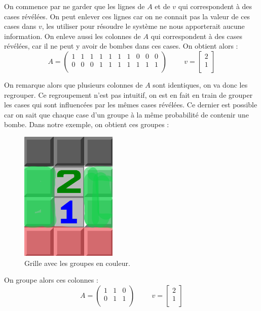 On commence par ne garder que les lignes de $A$ et de $v$ qui correspondent à des cases révélées.
On peut enlever ces lignes car on ne connait pas la valeur de ces cases dans $v$, les utiliser pour résoudre le système ne nous apporterait aucune information.
\newline
\newline
On enleve aussi les colonnes de $A$ qui correspondent à des cases révélées, car il ne peut y avoir de bombes dans ces cases.
\newline
On obtient alors :
\[
    A = \begin{pmatrix}
        1 & 1 & 1 & 1 & 1 & 1 & 1 & 0 & 0 & 0 \\
        0 & 0 & 0 & 1 & 1 & 1 & 1 & 1 & 1 & 1 \\
    \end{pmatrix}
    \hspace{1cm}
    v = \begin{bmatrix} 2 \\1 \\ \end{bmatrix}
\]

On remarque alors que plusieurs colonnes de $A$ sont identiques, on va donc les regrouper.
Ce regroupement n'est pas intuitif, on est en fait en train de grouper les cases qui sont influencées par les mêmes cases révélées.
Ce dernier est possible car on sait que chaque case d'un groupe à la même probabilité de contenir une bombe.
\newline
Dans notre exemple, on obtient ces groupes :

\begin{figure}[!htpb]
    \centering
    \includegraphics[width=0.2\linewidth]{Figures/groups-on-board.png}
    \caption[Grille avec les groupes en couleur]{Grille avec les groupes en couleur.}
    \label{fig:groups-on-board}
\end{figure}

On groupe alors ces colonnes :
\[
    A = \begin{pmatrix}
        1 & 1 & 0 \\
        0 & 1 & 1 \\
    \end{pmatrix}
    \hspace{1cm}
    v = \begin{bmatrix} 2 \\1 \\ \end{bmatrix}
\]

